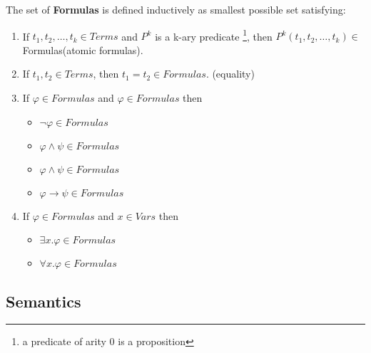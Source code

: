 \begin{defs}
	The set of \textbf{Formulas} is defined inductively as smallest possible set satisfying:
	\begin{enumerate}
		\item If $t_{1},t_{2},\ldots,t_{k} \in Terms$ and $P^{k}$ is a k-ary predicate \footnote{a predicate of arity 0 is a proposition}, then $P^{k}(t_{1},t_{2},\ldots,t_{k}) \in$ Formulas(atomic formulas).
		\item If $t_{1},t_{2} \in Terms$, then $t_{1} = t_{2} \in Formulas$. (equality)
		\item If $\varphi \in Formulas$ and $\varphi \in Formulas$ then
		\begin{itemize}
			\item $\neg\varphi \in Formulas$
			\item $\varphi \wedge \psi \in Formulas $
			\item $\varphi \wedge \psi \in Formulas $
			\item $\varphi \rightarrow \psi \in Formulas$
		\end{itemize}
		\item If $\varphi \in Formulas$ and $x \in Vars$ then
		\begin{itemize}
			\item $\exists x.\varphi \in Formulas$
			\item $\forall x.\varphi \in Formulas$
		\end{itemize} 
	\end{enumerate}	 
\end{defs}

\subsection*{Semantics}

